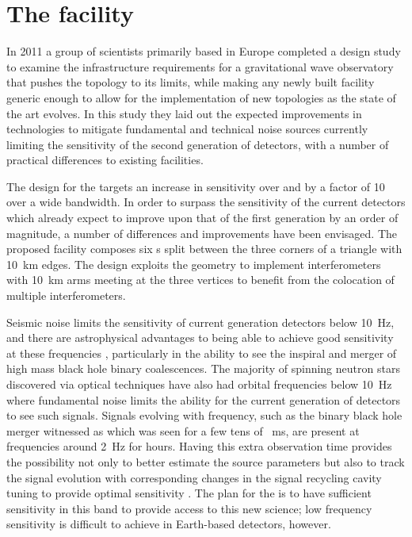 \section{The \ET{} facility}
In 2011 a group of scientists primarily based in Europe completed a design study \cite{ET2011} to examine the infrastructure requirements for a gravitational wave observatory that pushes the \MI{} topology to its limits, while making any newly built facility generic enough to allow for the implementation of new topologies as the state of the art evolves. In this study they laid out the expected improvements in technologies to mitigate fundamental and technical noise sources currently limiting the sensitivity of the second generation of detectors, with a number of practical differences to existing facilities.

The design for the \ET{} targets an increase in sensitivity over \ALIGO{} and \AVIRGO{} by a factor of \num{10} over a wide bandwidth. In order to surpass the sensitivity of the current detectors which already expect to improve upon that of the first generation by an order of magnitude, a number of differences and improvements have been envisaged. The proposed \ET{} facility composes six \DRFPMI{}s split between the three corners of a triangle with \SI{10}{\kilo\meter} edges. The design exploits the geometry to implement interferometers with \SI{10}{\kilo\meter} arms meeting at the three vertices to benefit from the colocation of multiple interferometers.

Seismic noise limits the sensitivity of current generation detectors below \SI{10}{\hertz}, and there are astrophysical advantages to being able to achieve good sensitivity at these frequencies \cite{Sathyaprakash2012}, particularly in the ability to see the inspiral and merger of high mass black hole binary coalescences. The majority of spinning neutron stars discovered via optical techniques have also had orbital frequencies below \SI{10}{\hertz} where fundamental noise limits the ability for the current generation of detectors to see such signals. Signals evolving with frequency, such as the binary black hole merger witnessed as \GWFIRSTEVENT{} \cite{Abbott2016} which was seen for a few tens of \SI{}{\milli\second}, are present at frequencies around \SI{2}{\hertz} for hours. Having this extra observation time provides the possibility not only to better estimate the source parameters but also to track the signal evolution with corresponding changes in the signal recycling cavity tuning to provide optimal sensitivity \cite{Heinzel2002, Simakov2014}. The plan for the \ET{} is to have sufficient sensitivity in this band to provide access to this new science; low frequency sensitivity is difficult to achieve in Earth-based detectors, however.

